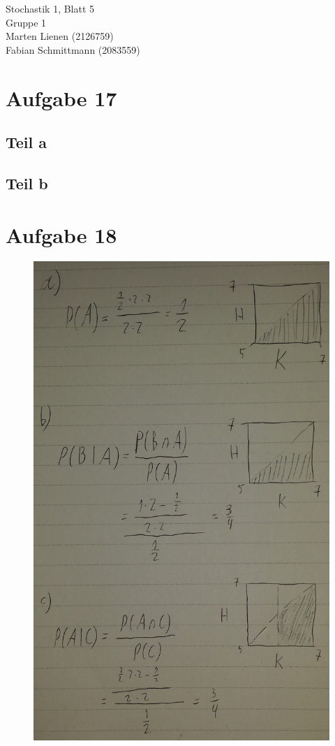 \documentclass[10pt,a4paper]{article}
\begin{document}
Stochastik 1, Blatt 5\\
Gruppe 1\\
Marten Lienen (2126759)\\
Fabian Schmittmann (2083559)

\section{Aufgabe 17}

\subsection{Teil a}

\subsection{Teil b}

\section{Aufgabe 18}

\begin{figure}[H]
  \includegraphics[width=400pt]{5_2}
\end{figure}
\end{document}
